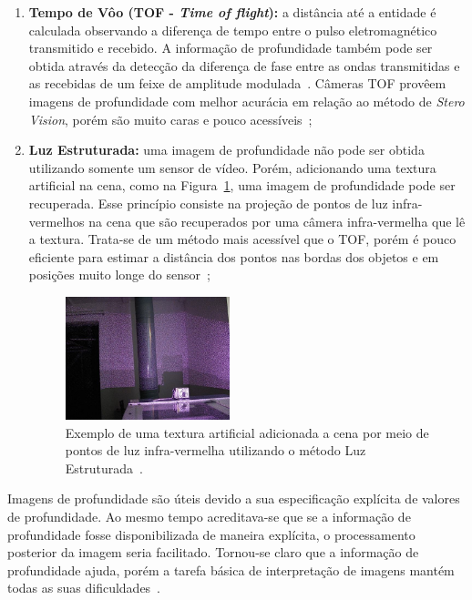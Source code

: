 \begin{enumerate}
		\item \textbf{Tempo de Vôo (TOF - \textit{Time of flight}):} a distância até a
		entidade é calculada observando a diferença de tempo entre o pulso
		eletromagnético transmitido e recebido. A informação de profundidade também pode
		ser obtida através da detecção da diferença de fase entre as ondas transmitidas
		e as recebidas de um feixe de amplitude modulada~\cite{jain, fall-detection}.
		Câmeras TOF provêem imagens de profundidade com melhor acurácia em relação ao
		método de \textit{Stero Vision}, porém são muito caras e pouco
		acessíveis~\cite{fall-detection};
		
		\item \textbf{Luz Estruturada:} uma imagem de
		profundidade não pode ser obtida utilizando somente um sensor de vídeo. Porém,
		adicionando uma textura artificial na cena, como na
		Figura~\ref{fig:structured-light}, uma imagem de profundidade pode ser
		recuperada. Esse princípio consiste na projeção de pontos de luz infra-vermelhos
		na cena que são recuperados por uma câmera infra-vermelha que lê a textura.
		Trata-se de um método mais acessível que o TOF, porém é pouco eficiente
		para estimar a distância dos pontos nas bordas dos objetos e em posições muito
		longe do sensor~\cite{fall-detection};
		
		\begin{figure}[H]
			\begin{center}
				\includegraphics[width=0.45\textwidth]{figuras/2.FundamentacaoTeorica/structured-light.jpg}
			\end{center}
			\caption{Exemplo de uma textura artificial adicionada a cena por meio de
			pontos de luz infra-vermelha utilizando o método Luz Estruturada~\cite{img-strutuctured-light}.}
			\label{fig:structured-light}
		\end{figure}
	\end{enumerate}

	Imagens de profundidade são úteis devido a sua especificação explícita de
	valores de profundidade. Ao mesmo tempo acreditava-se que se a informação de
	profundidade fosse disponibilizada de maneira explícita, o processamento
	posterior da imagem seria facilitado. Tornou-se claro que a informação de
	profundidade ajuda, porém a tarefa básica de interpretação de imagens mantém
	todas as suas dificuldades~\cite{jain}.

